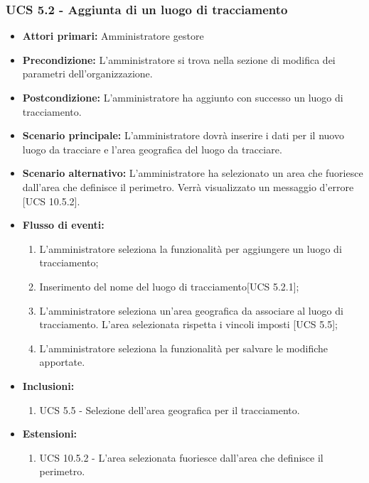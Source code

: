 \subsubsection{UCS 5.2 - Aggiunta di un luogo di tracciamento}%
\begin{itemize}
    \item \textbf{Attori primari:} Amministratore gestore
    \item \textbf{Precondizione:} L'amministratore si trova nella sezione di modifica dei parametri dell'organizzazione.
    \item \textbf{Postcondizione:} L'amministratore ha aggiunto con successo un luogo di tracciamento.
    \item \textbf{Scenario principale:} L'amministratore dovrà inserire i dati per il nuovo luogo da tracciare e l'area geografica del luogo da tracciare.
    \item \textbf{Scenario alternativo:} L'amministratore ha selezionato un area che fuoriesce dall'area che definisce il perimetro. Verrà visualizzato un messaggio d'errore [UCS 10.5.2].
    \item \textbf{Flusso di eventi:}
    \begin{enumerate}     
        \item L'amministratore seleziona la funzionalità per aggiungere un luogo di tracciamento;
        \item Inserimento del nome del luogo di tracciamento[UCS 5.2.1];
        \item L'amministratore seleziona un'area geografica da associare al luogo di tracciamento. L'area selezionata rispetta i vincoli imposti [UCS 5.5]; 
        \item L'amministratore seleziona la funzionalità per salvare le modifiche apportate.
    \end{enumerate}   
    \item \textbf{Inclusioni:}
    \begin{enumerate}
        \item UCS 5.5 - Selezione dell'area geografica per il tracciamento.
    \end{enumerate}
    \item \textbf{Estensioni:}
    \begin{enumerate}
        \item UCS 10.5.2 - L'area selezionata fuoriesce dall'area che definisce il perimetro.
    \end{enumerate}
\end{itemize}

